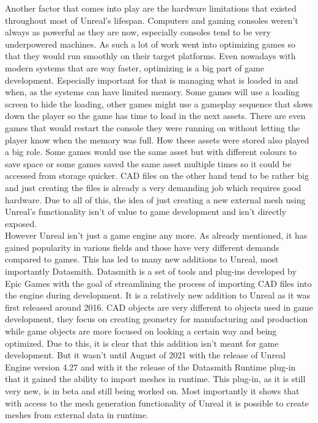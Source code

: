 Another factor that comes into play are the hardware limitations that existed throughout most of Unreal's lifespan. Computers and gaming consoles weren't always as powerful as they are now, especially consoles tend to be very underpowered machines. As such a lot of work went into optimizing games so that they would run smoothly on their target platforms. Even nowadays with modern systems that are way faster, optimizing is a big part of game development. Especially important for that is managing what is loaded in and when, as the systems can have limited memory. Some games will use a loading screen to hide the loading, other games might use a gameplay sequence that slows down the player so the game has time to load in the next assets. There are even games that would restart the console they were running on without letting the player know when the memory was full\cite{bib:Morrowind}. How these assets were stored also played a big role. Some games would use the same asset but with different colours to save space or some games saved the same asset multiple times so it could be accessed from storage quicker. \acs{CAD} files on the other hand tend to be rather big and just creating the files is already a very demanding job which requires good hardware. Due to all of this, the idea of just creating a new external mesh using Unreal's functionality isn't of value to game development and isn't directly exposed.\\
However Unreal isn't just a game engine any more. As already mentioned, it has gained popularity in various fields and those have very different demands compared to games. This has led to many new additions to Unreal, most importantly Datasmith. Datasmith is a set of tools and plug-ins developed by Epic Games with the goal of streamlining the process of importing \acs{CAD} files into the engine during development\cite{bib:DSDoc}. It is a relatively new addition to Unreal as it was first released around 2016. \acs{CAD} objects are very different to objects used in game development, they focus on creating geometry for manufacturing and production while game objects are more focused on looking a certain way and being optimized. Due to this, it is clear that this addition isn't meant for game development. But it wasn't until August of 2021 with the release of Unreal Engine version 4.27 and with it the release of the Datasmith Runtime plug-in that it gained the ability to import meshes in runtime\cite{bib:DSRunDoc}. This plug-in, as it is still very new, is in beta and still being worked on. Most importantly it shows that with access to the mesh generation functionality of Unreal it is possible to create meshes from external data in runtime.\\ 


